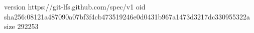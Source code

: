version https://git-lfs.github.com/spec/v1
oid sha256:08121a487090a07bf3f4cb473519246e0d0431b967a1473d3217dc330955322a
size 292253
